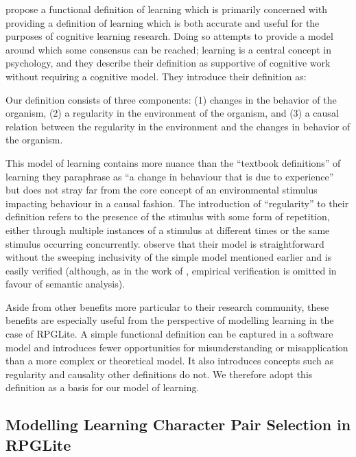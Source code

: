 \citet{de2013learning} propose a functional definition of learning which is
primarily concerned with providing a definition of learning which is both
accurate and useful for the purposes of cognitive learning research. Doing so
attempts to provide a model around which some consensus can be reached; learning
is a central concept in psychology, and they describe their definition as
supportive of cognitive work without requiring a cognitive model. They introduce
their definition as:

\begin{displayquote}
Our definition consists of three components: (1) changes in the behavior of the
organism, (2) a regularity in the environment of the organism, and (3) a causal
relation between the regularity in the environment and the changes in behavior
of the organism.
\end{displayquote}

This model of learning contains more nuance than the ``textbook definitions'' of
learning they paraphrase as ``a change in behaviour that is due to experience''
but does not stray far from the core concept of an environmental stimulus
impacting behaviour in a causal fashion. The introduction of ``regularity'' to
their definition refers to the presence of the stimulus with some form of
repetition, either through multiple instances of a stimulus at different times
or the same stimulus occurring concurrently. \citet{de2013learning} observe that
their model is straightforward without the sweeping inclusivity of the simple
model mentioned earlier and is easily verified (although, as in the work of
\citet{lachman1997learning}, empirical verification is omitted in favour of
semantic analysis).

Aside from other benefits more particular to their research community, these
benefits are especially useful from the perspective of modelling learning in the
case of RPGLite. A simple functional definition can be captured in a software
model and introduces fewer opportunities for misunderstanding or misapplication
than a more complex or theoretical model. It also introduces  concepts such as
regularity and causality other definitions do not. We therefore adopt this
definition as a basis for our model of learning.



\subsection{Modelling Learning Character Pair Selection in RPGLite}
\label{subsec:defining_our_models_of_learning}
\label{learning_model_details}

